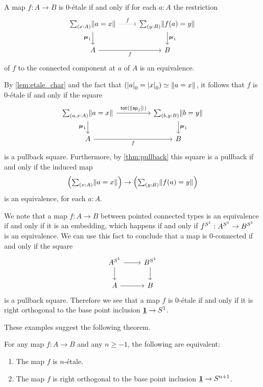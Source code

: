 \documentclass[9pt,twosided]{amsart}
\begin{document}
\begin{eg}
A map $f:A\to B$ is $0$-\'etale if and only if for each $a:A$ the restriction
\begin{equation*}
\begin{tikzcd}
\sm{x:A}\brck{a=x} \arrow[d,swap,"\proj 1"] \arrow[r,densely dotted,"f"] & \sm{y:B}\brck{f(a)=y} \arrow[d,"\proj 1"] \\
A \arrow[r,swap,"f"] & B
\end{tikzcd}
\end{equation*}
of $f$ to the connected component at $a$ of $A$ is an equivalence.

By \cref{lem:etale_char} and the fact that $\eqv{(\tproj{0}{a}=\tproj{0}{x})}{\brck{a=x}}$, it follows that $f$ is $0$-\'etale if and only if the square
\begin{equation*}
\begin{tikzcd}[column sep=huge]
\sm{a,x:A}\brck{a=x} \arrow[d,swap,"\proj 1"] \arrow[r,"\total{\brck{\apfunc{f}}}"] & \sm{b,y:B}\brck{b=y} \arrow[d,"\proj 1"] \\
A \arrow[r,swap,"f"] & B
\end{tikzcd}
\end{equation*}
is a pullback square. Furthermore, by \cref{thm:pullback} this square is a pullback if and only if the induced map
\begin{equation*}
\Big(\sm{x:A}\brck{a=x}\Big)\to\Big(\sm{y:B}\brck{f(a)=y}\Big)
\end{equation*}
is an equivalence, for each $a:A$.

We note that a map $f:A\to B$ between pointed connected types is an equivalence if and only if it is an embedding, which happens if and only if $f^{S^{1}}:A^{S^{1}} \to B^{S^{1}}$ is an equivalence. We can use this fact to conclude that a map is $0$-connected if and only if the square
\begin{equation*}
  \begin{tikzcd}
    A^{\sphere{1}} \arrow[r] \arrow[d] & B^{\sphere{1}} \arrow[d] \\
    A \arrow[r] & B
  \end{tikzcd}
\end{equation*}
is a pullback square. Therefore we see that a map $f$ is $0$-\'etale if and only if it is right orthogonal to the base point inclusion $\underline{\mathbf{1}}\to S^{1}$.
\end{eg}

These examples suggest the following theorem.

\begin{thm}
  \label{thm:char_n_etale}
  For any map $f:A\to B$ and any $n\geq -1$, the following are equivalent:
  \begin{enumerate}
  \item The map $f$ is $n$-\'etale.
  \item The map $f$ is right orthogonal to the base point inclusion $\underline{\mathbf{1}}\to S^{n+1}$.
  \end{enumerate}
\end{thm}
\end{document}
